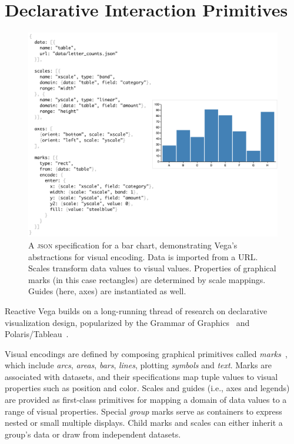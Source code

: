 \graphicspath{{./vega-lang/figures/}}
\chapter{Declarative Interaction Primitives}
\label{sec:vg:lang}

\vspace{-30pt}

\begin{figure}[b!]
  \centering
  \includegraphics[width=0.95\columnwidth]{barChart}
  \caption{A \textsc{json} specification for a bar chart, demonstrating Vega's
  abstractions for visual encoding. Data is imported from a URL. Scales
  transform data values to visual values. Properties of graphical marks (in this
  case rectangles) are determined by scale mappings. Guides (here, axes) are
  instantiated as well.}
  \label{fig:vg:barChart}
\end{figure}

Reactive Vega builds on a long-running thread of research on declarative
visualization design, popularized by the Grammar of
Graphics~\cite{wilkinson:grammar} and Polaris/Tableau~\cite{stolte:polaris}.

Visual encodings are defined by composing graphical primitives called
\emph{marks}~\cite{bostock:protovis}, which include \emph{arcs}, \emph{areas},
\emph{bars}, \emph{lines}, plotting \emph{symbols} and \emph{text}. Marks are
associated with datasets, and their specifications map tuple values to visual
properties such as position and color. Scales and guides (i.e., axes and
legends) are provided as first-class primitives for mapping a domain of data
values to a range of visual properties. Special \emph{group} marks serve as
containers to express nested or small multiple displays. Child marks and scales
can either inherit a group's data or draw from independent datasets.

